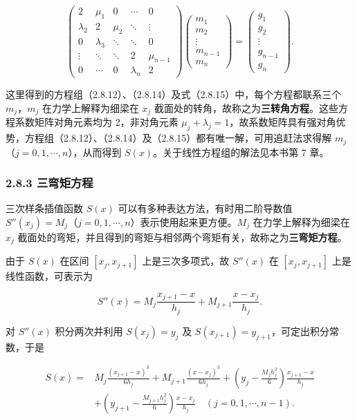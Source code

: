 \[\begin{pmatrix}
2&\mu_1&0&\cdots&0\\
\lambda_2&2&\mu_2&\ddots&\vdots\\
0&\lambda_3&\ddots&\ddots&0\\
\vdots&\ddots&\ddots&2&\mu_{n-1}\\
0&\cdots&0&\lambda_n&2
\end{pmatrix}
\begin{pmatrix}m_1\\m_2\\\vdots\\m_{n-1}\\m_n\end{pmatrix}
=\begin{pmatrix}g_1\\g_2\\\vdots\\g_{n-1}\\g_n\end{pmatrix}.\tag{2.8.15}\]

这里得到的方程组（2.8.12）、（2.8.14）及式（2.8.15）中，每个方程都联系三个 \(m_j\)，\(m_j\) 在力学上解释为细梁在 \(x_j\) 截面处的转角，故称之为\textbf{三转角方程}。这些方程系数矩阵对角元素均为 2，非对角元素 \(\mu_j+\lambda_j=1\)，故系数矩阵具有强对角优势，方程组（2.8.12）、（2.8.14）及（2.8.15）都有唯一解，可用追赶法求得解 \(m_j\)（\(j=0,1,\cdots,n\)），从而得到 \(S(x)\)。关于线性方程组的解法见本书第 7 章。

\subsubsection{2.8.3 三弯矩方程}\label{ch02b-ux4e09ux5f2fux77e9ux65b9ux7a0b}

三次样条插值函数 \(S(x)\) 可以有多种表达方法，有时用二阶导数值 \(S''(x_j)=M_j\)（\(j=0,1,\cdots,n\)）表示使用起来更方便。\(M_j\) 在力学上解释为细梁在 \(x_j\) 截面处的弯矩，并且得到的弯矩与相邻两个弯矩有关，故称之为\textbf{三弯矩方程}。

由于 \(S(x)\) 在区间 \([x_j,x_{j+1}]\) 上是三次多项式，故 \(S''(x)\) 在 \([x_j,x_{j+1}]\) 上是线性函数，可表示为

\[S''(x)=M_j\frac{x_{j+1}-x}{h_j}+M_{j+1}\frac{x-x_j}{h_j}.\tag{2.8.16}\]

对 \(S''(x)\) 积分两次并利用 \(S(x_j)=y_j\) 及 \(S(x_{j+1})=y_{j+1}\)，可定出积分常数，于是

\[\begin{aligned}
S(x)={}&M_j\frac{(x_{j+1}-x)^3}{6h_j}+M_{j+1}\frac{(x-x_j)^3}{6h_j}+\left(y_j-\frac{M_jh_j^2}6\right)\frac{x_{j+1}-x}{h_j}\\
&+\left(y_{j+1}-\frac{M_{j+1}h_j^2}6\right)\frac{x-x_j}{h_j}\quad(j=0,1,\cdots,n-1).
\end{aligned}\tag{2.8.17}\]

